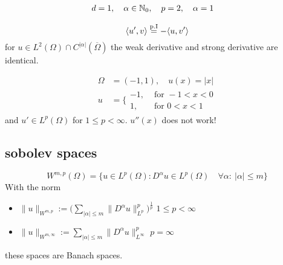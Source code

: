 \begin{example}
	\begin{align*}
	d&= 1, \quad \alpha \in \mathbb{N}_0, \quad p=2, \quad \alpha=1
	\end{align*}
	
	\begin{equation*}
	\langle u',v \rangle\overset{\text{p.I} }{=} -\langle u,v'\rangle\\
	\end{equation*}
	for $u \in L^2(\Omega)\cap C^{|\alpha|}( \overline{\Omega} )$ the weak derivative and strong derivative are identical.
\end{example}

\begin{example}

\begin{align*}
	\Omega &= (-1,1),\quad u(x) = |x|\\
	u&=  \Bigg\{
	\begin{array}{cl}
		-1 ,  &\text{ for } -1 < x < 0\\
		1 ,  &\text{ for } 0 < x <1 
	\end{array}
\end{align*}
and $u' \in L^p(\Omega)$ for $1 \leq p < \infty$. $u''(x)$ does not work!\enter
\end{example}

\subsection{sobolev spaces}

\begin{equation*}
	W^{m,p}(\Omega) = \big\{ u\in L^p(\Omega) : D^\alpha u \in L^p(\Omega) \quad \forall \alpha:\ |\alpha|\leq m \big\}
\end{equation*}
With the norm

\begin{itemize}
	\item $\| u\|_{W^{m,p}} := \Big ( \displaystyle\sum_{|\alpha|\leq m}  \| D^\alpha u \|^p_{L^p}  \Big )^{\frac{1}{p}}$ \qquad $1\leq p < \infty$
	\item  $\| u\|_{W^{m,\infty}} :=  \displaystyle\sum_{|\alpha|\leq m}  \| D^\alpha u \|^p_{L^\infty}  $ \qquad $ p = \infty$
\end{itemize}

these spaces are Banach spaces.


